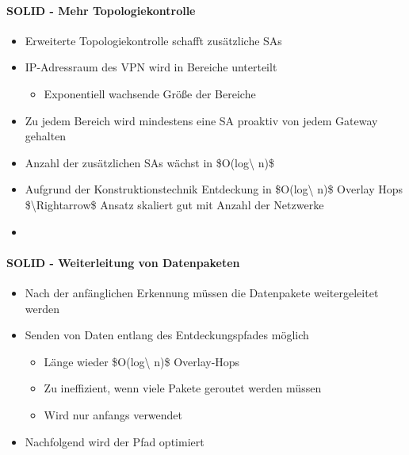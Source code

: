 \documentclass[a4paper]{article}
\begin{document}
\begin{multicols}{3}
    \paragraph{SOLID - Mehr
        Topologiekontrolle}

    \begin{itemize}
        \item
              Erweiterte Topologiekontrolle schafft zusätzliche SAs
        \item
              IP-Adressraum des VPN wird in Bereiche unterteilt

              \begin{itemize}
                  \item
                        Exponentiell wachsende Größe der Bereiche
              \end{itemize}
        \item
              Zu jedem Bereich wird mindestens eine SA proaktiv von jedem Gateway
              gehalten
        \item
              Anzahl der zusätzlichen SAs wächst in \$O(log\textbackslash{} n)\$
        \item
              Aufgrund der Konstruktionstechnik Entdeckung in
              \$O(log\textbackslash{} n)\$ Overlay Hops
              \$\textbackslash Rightarrow\$ Ansatz skaliert gut mit Anzahl der
              Netzwerke
        \item
    \end{itemize}


    \paragraph{SOLID - Weiterleitung von
        Datenpaketen}

    \begin{itemize}
        \item
              Nach der anfänglichen Erkennung müssen die Datenpakete weitergeleitet
              werden
        \item
              Senden von Daten entlang des Entdeckungspfades möglich

              \begin{itemize}
                  \item
                        Länge wieder \$O(log\textbackslash{} n)\$ Overlay-Hops
                  \item
                        Zu ineffizient, wenn viele Pakete geroutet werden müssen
                  \item
                        Wird nur anfangs verwendet
              \end{itemize}
        \item
              Nachfolgend wird der Pfad optimiert


\end{itemize}
\end{multicols}
\end{document}
